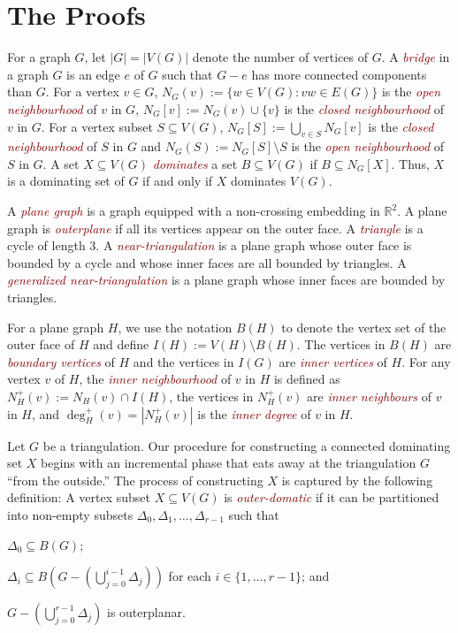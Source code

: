 \documentclass[12pt]{article}
\newcommand{\defin}[1]{\emph{\textcolor{Maroon}{#1}}}
\begin{document}
\section{The Proofs}

For a graph $G$, let $|G|=|V(G)|$ denote the number of vertices of $G$.  A \defin{bridge} in a graph $G$ is an edge $e$ of $G$ such that $G-e$ has more connected components than $G$.  For a vertex $v\in G$, $N_G(v):=\{w\in V(G):vw\in E(G)\}$ is the \defin{open neighbourhood} of $v$ in $G$,  $N_G[v]:=N_G(v)\cup\{v\}$ is the \defin{closed neighbourhood} of $v$ in $G$.  For a vertex subset $S\subseteq V(G)$, $N_G[S]:=\bigcup_{v\in S} N_{G}[v]$ is the \defin{closed neighbourhood} of $S$ in $G$ and $N_G(S):=N_G[S]\setminus S$ is the \defin{open neighbourhood} of $S$ in $G$.  A set $X\subseteq V(G)$ \defin{dominates} a set $B\subseteq V(G)$ if $B\subseteq N_G[X]$.  Thus, $X$ is a dominating set of $G$ if and only if $X$ dominates $V(G)$.

A \defin{plane graph} is a graph equipped with a non-crossing embedding in $\mathbb{R}^2$.  A plane graph is \defin{outerplane} if all its vertices appear on the outer face.  A \defin{triangle} is a cycle of length $3$. A \defin{near-triangulation} is a plane graph whose outer face is bounded by a cycle and whose inner faces are all bounded by triangles.  A \defin{generalized near-triangulation} is a plane graph whose inner faces are bounded by triangles.


For a plane graph $H$, we use the notation $B(H)$ to denote the vertex set of the outer face of $H$ and define $I(H):=V(H)\setminus B(H)$.  The vertices in $B(H)$ are \defin{boundary vertices} of $H$ and the vertices in $I(G)$ are \defin{inner vertices} of $H$. For any vertex $v$ of $H$, the \defin{inner neighbourhood} of $v$ in $H$ is defined as $N_H^+(v):=N_H(v)\cap I(H)$, the vertices in $N^+_H(v)$ are \defin{inner neighbours} of $v$ in $H$, and $\deg^+_H(v)=|N^+_H(v)|$ is the \defin{inner degree} of $v$ in $H$.

Let $G$ be a triangulation.  Our procedure for constructing a connected dominating set $X$ begins with an incremental phase that eats away at the triangulation $G$ ``from the outside.'' The process of constructing $X$ is captured by the following definition:   A vertex subset $X\subseteq V(G)$ is \defin{outer-domatic} if it can be partitioned into non-empty subsets $\Delta_0,\Delta_1,\ldots,\Delta_{r-1}$ such that
\begin{compactenum}[(P1)]
    \item $\Delta_0\subseteq B(G)$; \label{outer_face}
    \item $\Delta_i\subseteq B(G-(\bigcup_{j=0}^{i-1}\Delta_j))$ for each $i\in\{1,\ldots,r-1\}$; and \label{incremental}
    \item $G-(\bigcup_{j=0}^{r-1}\Delta_j)$ is outerplanar. \label{outerplanar}
\end{compactenum}
\end{document}
